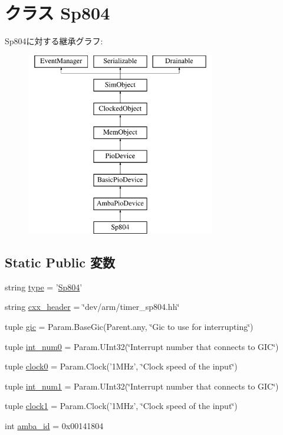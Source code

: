 \hypertarget{classRealView_1_1Sp804}{
\section{クラス Sp804}
\label{classRealView_1_1Sp804}
}
Sp804に対する継承グラフ:\begin{figure}[H]
\begin{center}
\leavevmode
\includegraphics[height=8cm]{classRealView_1_1Sp804}
\end{center}
\end{figure}
\subsection*{Static Public 変数}
\begin{DoxyCompactItemize}
\item 
string \hyperlink{classRealView_1_1Sp804_acce15679d830831b0bbe8ebc2a60b2ca}{type} = '\hyperlink{classRealView_1_1Sp804}{Sp804}'
\item 
string \hyperlink{classRealView_1_1Sp804_a17da7064bc5c518791f0c891eff05fda}{cxx\_\-header} = \char`\"{}dev/arm/timer\_\-sp804.hh\char`\"{}
\item 
tuple \hyperlink{classRealView_1_1Sp804_a40243beb62d217c3a9e35801ae739fd0}{gic} = Param.BaseGic(Parent.any, \char`\"{}Gic to use for interrupting\char`\"{})
\item 
tuple \hyperlink{classRealView_1_1Sp804_a8d446ae3c2f465cf5832be0409506c62}{int\_\-num0} = Param.UInt32(\char`\"{}Interrupt number that connects to GIC\char`\"{})
\item 
tuple \hyperlink{classRealView_1_1Sp804_a68d3e128a09682ed8757b39abe2cc431}{clock0} = Param.Clock('1MHz', \char`\"{}Clock speed of the input\char`\"{})
\item 
tuple \hyperlink{classRealView_1_1Sp804_a4556e7e3e444a3c9695c3aef876c6ef8}{int\_\-num1} = Param.UInt32(\char`\"{}Interrupt number that connects to GIC\char`\"{})
\item 
tuple \hyperlink{classRealView_1_1Sp804_aae31cfd91316d3a739200ee894fa9633}{clock1} = Param.Clock('1MHz', \char`\"{}Clock speed of the input\char`\"{})
\item 
int \hyperlink{classRealView_1_1Sp804_a38d7b9edfe6f0eea7a54e7e4f6253f3a}{amba\_\-id} = 0x00141804
\end{DoxyCompactItemize}


